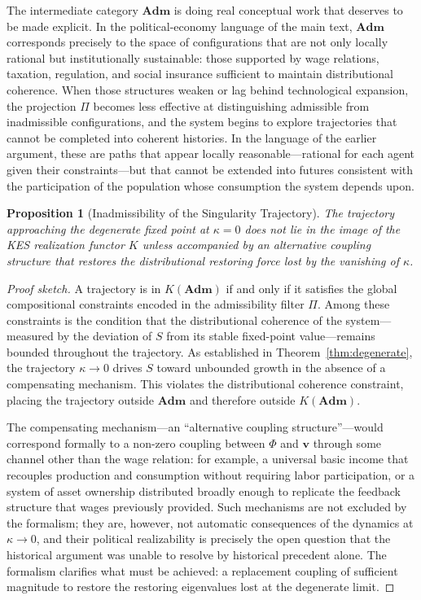 \documentclass[11pt, a4paper]{article}
\theoremstyle{plain}
\newtheorem{proposition}[theorem]{Proposition}
\theoremstyle{definition}
\newcommand{\Phifield}{\Phi}
\newcommand{\vfield}{\mathbf{v}}
\newcommand{\Sfield}{S}
\newcommand{\Adm}{\mathbf{Adm}}
\newcommand{\KES}{K}
\newcommand{\coupling}{\kappa}
\begin{document}
The intermediate category $\Adm$ is doing real conceptual work that deserves
to be made explicit. In the political-economy language of the main text,
$\Adm$ corresponds precisely to the space of configurations that are not only
locally rational but institutionally sustainable: those supported by wage
relations, taxation, regulation, and social insurance sufficient to maintain
distributional coherence. When those structures weaken or lag behind
technological expansion, the projection $\Pi$ becomes less effective at
distinguishing admissible from inadmissible configurations, and the system
begins to explore trajectories that cannot be completed into coherent histories.
In the language of the earlier argument, these are paths that appear locally
reasonable---rational for each agent given their constraints---but that cannot
be extended into futures consistent with the participation of the population
whose consumption the system depends upon.

\begin{proposition}[Inadmissibility of the Singularity Trajectory]
\label{prop:inadmissible}
The trajectory approaching the degenerate fixed point at $\coupling = 0$
does not lie in the image of the KES realization functor $\KES$ unless
accompanied by an alternative coupling structure that restores the
distributional restoring force lost by the vanishing of $\coupling$.
\end{proposition}

\begin{proof}[Proof sketch]
A trajectory is in $\KES(\Adm)$ if and only if it satisfies the global
compositional constraints encoded in the admissibility filter $\Pi$. Among
these constraints is the condition that the distributional coherence of the
system---measured by the deviation of $\Sfield$ from its stable fixed-point
value---remains bounded throughout the trajectory. As established in
Theorem~\ref{thm:degenerate}, the trajectory $\coupling \to 0$ drives
$\Sfield$ toward unbounded growth in the absence of a compensating mechanism.
This violates the distributional coherence constraint, placing the trajectory
outside $\Adm$ and therefore outside $\KES(\Adm)$.

The compensating mechanism---an ``alternative coupling structure''---would
correspond formally to a non-zero coupling between $\Phifield$ and $\vfield$
through some channel other than the wage relation: for example, a universal
basic income that recouples production and consumption without requiring labor
participation, or a system of asset ownership distributed broadly enough to
replicate the feedback structure that wages previously provided. Such
mechanisms are not excluded by the formalism; they are, however, not
automatic consequences of the dynamics at $\coupling \to 0$, and their
political realizability is precisely the open question that the historical
argument was unable to resolve by historical precedent alone. The formalism
clarifies what must be achieved: a replacement coupling of sufficient magnitude
to restore the restoring eigenvalues lost at the degenerate limit.
\end{proof}
\end{document}
